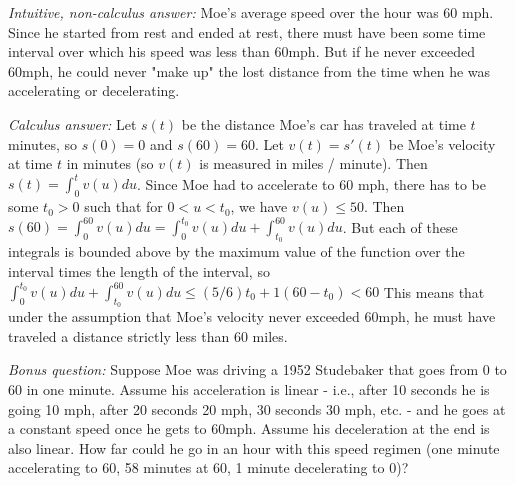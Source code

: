 \documentclass[11pt,a4paper]{report}
\theoremstyle{plain}
\theoremstyle{definition}
\theoremstyle{remark}
\begin{document}
\textit{Intuitive, non-calculus answer:} Moe's average speed over the hour was 60 mph.  Since he started from rest and ended at rest, there must have been some time interval over which his speed was less than 60mph.  But if he never exceeded 60mph, he could never "make up" the lost distance from the time when he was accelerating or decelerating.

\textit{Calculus answer: } Let $s(t)$ be the distance Moe's car has traveled at time $t$ minutes, so $s(0) = 0$ and $s(60)= 60$.  Let $v(t) = s'(t)$ be Moe's velocity at time $t$ in minutes (so $v(t)$ is measured in miles / minute).  Then $s(t) = \int_{0}^{t} v(u) du$. Since Moe had to accelerate to 60 mph, there has to be some $t_0>0$ such that for $0 < u < t_0$, we have $v(u) \leq 50$.  Then $s(60) = \int_{0}^{60} v(u) du = \int_{0}^{t_0} v(u) du + \int_{t_0}^{60} v(u) du$.  But each of these integrals is bounded above by the maximum value of the function over the interval times the length of the interval, so $\int_{0}^{t_0} v(u) du + \int_{t_0}^{60} v(u) du \leq (5/6) t_0 + 1(60 - t_0) < 60$ This means that under the assumption that Moe's velocity never exceeded 60mph, he must have traveled a distance strictly less than 60 miles.

\textit{Bonus question: } Suppose Moe was driving a 1952 Studebaker that goes from 0 to 60 in one minute.  Assume his acceleration is linear - i.e., after 10 seconds he is going 10 mph, after 20 seconds 20 mph, 30 seconds 30 mph, etc. - and he goes at a constant speed once he gets to 60mph.  Assume his deceleration at the end is also linear. How far could he go in an hour with this speed regimen (one minute accelerating to 60, 58 minutes at 60, 1 minute decelerating to 0)?
\end{document}
